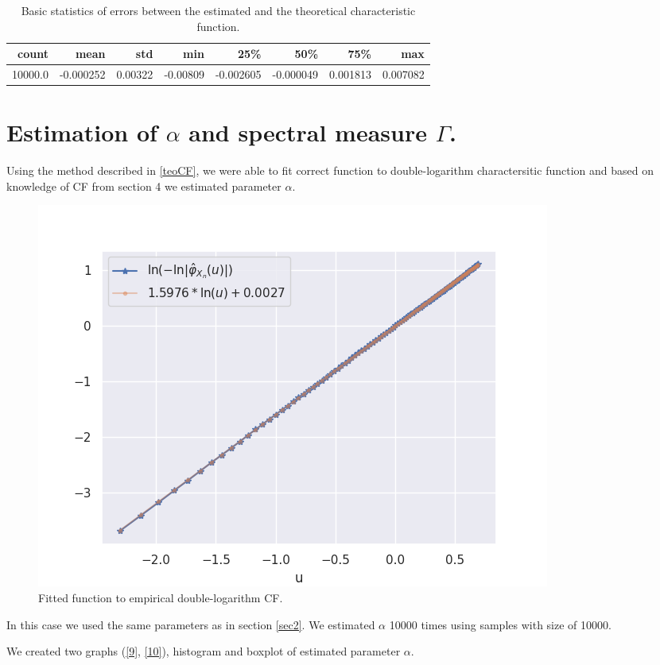 \documentclass{article}
\begin{document}
	\begin{table}[H]
		\begin{tabular}{rrrrrrrr}
			\hline
			count &      mean &      std &      min &       25\% &       50\% &       75\% &       max \\
			\hline
			10000.0 & -0.000252 &  0.00322 & -0.00809 & -0.002605 & -0.000049 &  0.001813 &  0.007082 \\
			\hline
		\end{tabular}
	\caption{Basic statistics of errors between the estimated and the theoretical characteristic function.}\label{tab1}
	\end{table}
	

	\section{Estimation of $\alpha$ and spectral measure $\Gamma$.}

	Using the method described in \ref{teoCF}, we were able to fit correct function to double-logarithm charactersitic function and based on knowledge of CF from section 4 we estimated parameter $\alpha$.
	
	\begin{figure}[H]
		\centering
		\includegraphics[width=0.8\linewidth]{images/compare_cf}
		\caption{Fitted function to empirical double-logarithm CF.}\label{11}
	\end{figure}
	In this case we used the same parameters as in section \ref{sec2}. We estimated $\alpha$ 10000 times using samples with size of 10000.
	
	We created two graphs (\ref{9}, \ref{10}), histogram and boxplot of estimated parameter $\alpha$.
	
\end{document}
